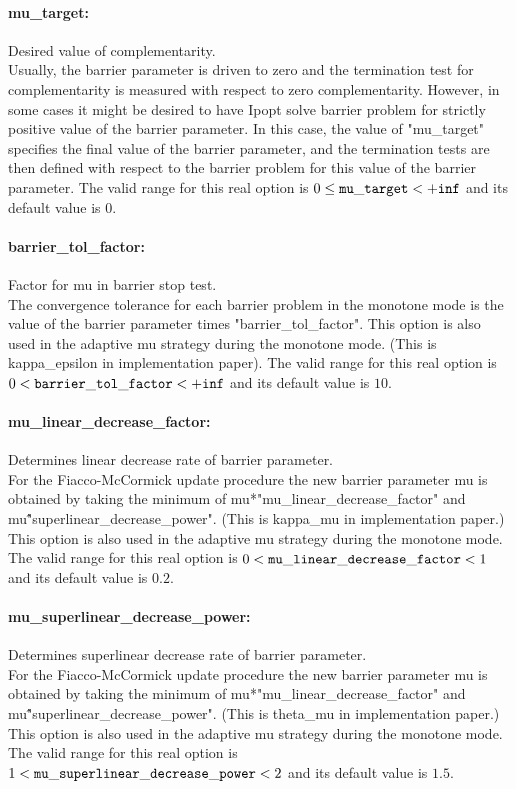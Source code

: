\paragraph{mu\_target:}\label{opt:mu_target} Desired value of complementarity. \\
 Usually, the barrier parameter is driven to zero
and the termination test for complementarity is
measured with respect to zero complementarity. 
However, in some cases it might be desired to
have Ipopt solve barrier problem for strictly
positive value of the barrier parameter.  In this
case, the value of "mu\_target" specifies the
final value of the barrier parameter, and the
termination tests are then defined with respect
to the barrier problem for this value of the
barrier parameter. The valid range for this real option is 
$0 \le {\tt mu\_target } <  {\tt +inf}$
and its default value is $0$.


\paragraph{barrier\_tol\_factor:}\label{opt:barrier_tol_factor} Factor for mu in barrier stop test. \\
 The convergence tolerance for each barrier
problem in the monotone mode is the value of the
barrier parameter times "barrier\_tol\_factor".
This option is also used in the adaptive mu
strategy during the monotone mode. (This is
kappa\_epsilon in implementation paper). The valid range for this real option is 
$0 <  {\tt barrier\_tol\_factor } <  {\tt +inf}$
and its default value is $10$.


\paragraph{mu\_linear\_decrease\_factor:}\label{opt:mu_linear_decrease_factor} Determines linear decrease rate of barrier parameter. \\
 For the Fiacco-McCormick update procedure the new
barrier parameter mu is obtained by taking the
minimum of mu*"mu\_linear\_decrease\_factor" and
mu\^"superlinear\_decrease\_power".  (This is
kappa\_mu in implementation paper.) This option
is also used in the adaptive mu strategy during
the monotone mode. The valid range for this real option is 
$0 <  {\tt mu\_linear\_decrease\_factor } <  1$
and its default value is $0.2$.


\paragraph{mu\_superlinear\_decrease\_power:}\label{opt:mu_superlinear_decrease_power} Determines superlinear decrease rate of barrier parameter. \\
 For the Fiacco-McCormick update procedure the new
barrier parameter mu is obtained by taking the
minimum of mu*"mu\_linear\_decrease\_factor" and
mu\^"superlinear\_decrease\_power".  (This is
theta\_mu in implementation paper.) This option
is also used in the adaptive mu strategy during
the monotone mode. The valid range for this real option is 
$1 <  {\tt mu\_superlinear\_decrease\_power } <  2$
and its default value is $1.5$.


